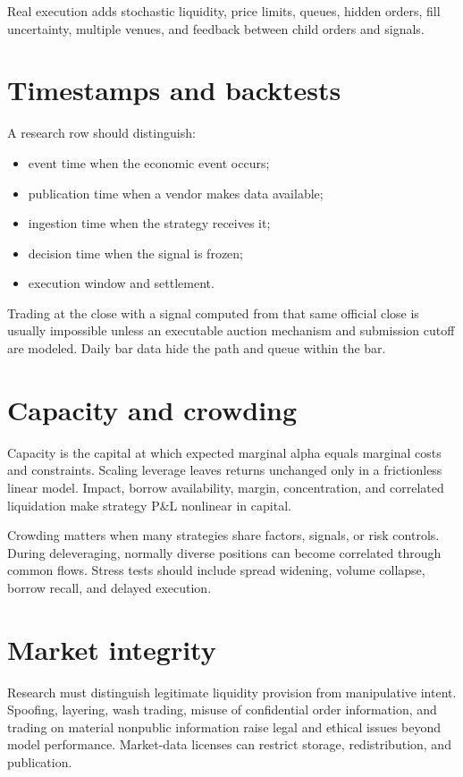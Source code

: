 Real execution adds stochastic liquidity, price limits, queues, hidden orders,
fill uncertainty, multiple venues, and feedback between child orders and signals.

\section{Timestamps and backtests}

A research row should distinguish:

\begin{itemize}
\item event time when the economic event occurs;
\item publication time when a vendor makes data available;
\item ingestion time when the strategy receives it;
\item decision time when the signal is frozen;
\item execution window and settlement.
\end{itemize}

Trading at the close with a signal computed from that same official close is usually
impossible unless an executable auction mechanism and submission cutoff are modeled.
Daily bar data hide the path and queue within the bar.

\section{Capacity and crowding}

Capacity is the capital at which expected marginal alpha equals marginal costs and
constraints. Scaling leverage leaves returns unchanged only in a frictionless
linear model. Impact, borrow availability, margin, concentration, and correlated
liquidation make strategy P\&L nonlinear in capital.

Crowding matters when many strategies share factors, signals, or risk controls.
During deleveraging, normally diverse positions can become correlated through common
flows. Stress tests should include spread widening, volume collapse, borrow recall,
and delayed execution.

\section{Market integrity}

Research must distinguish legitimate liquidity provision from manipulative intent.
Spoofing, layering, wash trading, misuse of confidential order information, and
trading on material nonpublic information raise legal and ethical issues beyond
model performance. Market-data licenses can restrict storage, redistribution, and
publication.

